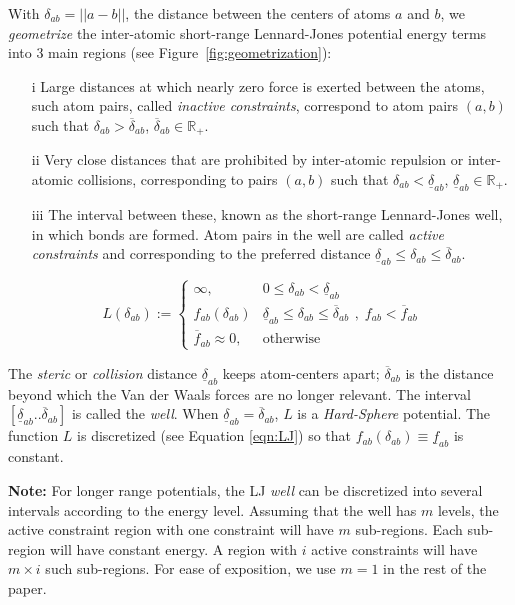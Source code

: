 \documentclass[]{article}
\newcommand{\figref}[1]{Figure~\ref{#1}}
\newcommand{\dst}{\delta}  \newcommand{\dlo}{\underline{\dst}}
\newcommand{\dhi}{\overline{\dst}}
\newcommand{\pone}{a}
\newcommand{\ptwo}{b}
\newcommand{\ijx}{{\pone\ptwo}}
\newcommand{\lj}{f}  \newcommand{\ljlo}{\underline{\lj}}
\newcommand{\ljhi}{\overline{\lj}}
\begin{document}
With $\dst_\ijx = ||a - b||$, the distance between the centers of atoms $a$ and
$b$, we \emph{geometrize} the inter-atomic short-range Lennard-Jones potential energy
terms into 3 main regions (see \figref{fig:geometrization}):
\begin{enumerate}
\item [i] Large distances at which nearly zero force is exerted between the atoms, such
atom pairs, called \emph{inactive constraints}, correspond to atom pairs
$(a,b)$ such that $\dst_\ijx > \dhi_\ijx $, $\dhi_\ijx \in \mathbb{R}_+$.

\item [ii] Very close distances that are prohibited by inter-atomic repulsion
or inter-atomic collisions, corresponding to pairs $(a,b)$ such that $\dst_\ijx
< \dlo_\ijx$, $\dlo_\ijx \in \mathbb{R}_+$.

\item [iii] The interval between these, known as the short-range Lennard-Jones well, in
which bonds are formed. Atom pairs in the well are called \emph{active
constraints} and corresponding to the preferred distance $\dlo_\ijx \le \dst_\ijx
\le \dhi_\ijx$.

\end{enumerate}
\begin{equation}
\label{eqn:LJ}
   L(\dst_\ijx) := \begin{cases}
      \infty,&  0 \leq \dst_\ijx < \dlo_{\ijx}\\
      \lj_\ijx(\dst_\ijx)  & \dlo_\ijx \leq \dst_\ijx \leq \dhi_\ijx \\
      \ljhi_\ijx \approx 0, & \text{otherwise}
      \end{cases}, \; \lj_\ijx < \ljhi_\ijx
\end{equation}

The {\em steric} or {\em collision} distance $\dlo_{\ijx}$ keeps atom-centers
apart; $\dhi_{\ijx}$ is the distance beyond which the Van der Waals forces are
no longer relevant. The interval $[\dlo_{\ijx}.. \dhi_{\ijx}]$ is called the
\emph{well}. When $\dlo_{\ijx} = \dhi_{\ijx}$, $L$ is a \emph{Hard-Sphere}
potential. The function $L$ is discretized (see Equation \ref{eqn:LJ}) so that
$\lj_\ijx(\dst_\ijx) \equiv \ljlo_\ijx$ is constant. 

{\bf Note:} For longer range potentials, the LJ \emph{well} can be discretized
into several intervals according to the energy level. Assuming that the well
has $m$ levels, the active constraint region with one constraint will have $m$
sub-regions. Each sub-region will have constant energy. A region with $i$
active constraints will have $m\times i$ such sub-regions. For ease of
exposition, we use $m=1$ in the rest of the paper.\\
\end{document}
